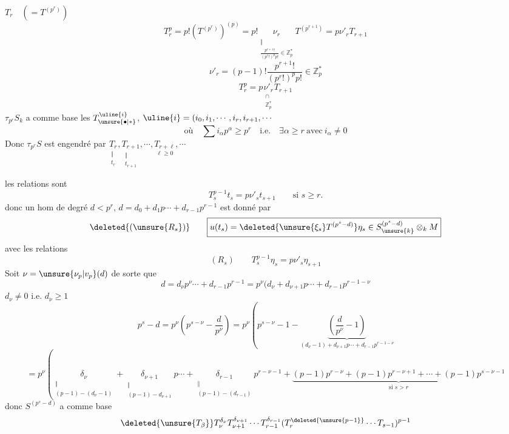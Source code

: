 $T_r\quad(=T^{(p^r)})$
\[
T_r^p=p!(T^{(p^r)})^{(p)}=p!\underset{\substack{\Vert\\\frac{p^{r+1}!}{(p^r!)^p p!}\in\mathbb Z_p^*}}{\nu_r}T^{(p^{r+1})}=p\nu'_rT_{r+1}
\]
\[
\nu'_r=(p-1)!\frac{p^{r+1}!}{(p^r!)^p p!}\in\mathbb Z_p^*
\]
\[
\boxed{T_r^p=p\underset{\substack{\cap\\\mathbb Z_p^*}}{\nu'_r}T_{r+1}}
\]
$\tau_{p^r}S_k$ a comme base les $T_{\unsure{\bullet|*}}^{\uline{i}}$, $\uline{i}=(i_0,i_1,\cdots,i_r,i_{r+1},\cdots$
\[
\text{où}\quad\sum i_\alpha p^\alpha\geq p^r\quad\text{i.e.}\quad\exists\alpha\geq r\ \text{avec}\ i_\alpha\ne0
\]
Donc $\tau_{p^r}S$ est engendré par $\underset{\substack{\Vert\\t_r}}{T_r},\underset{\substack{\Vert\\t_{r+1}}}{T_{r+1}},\cdots,\underset{\ell\geq0}{T_{r+\ell}},\cdots$

les relations sont
\[
\boxed{T_s^{p-1}t_s=p\nu'_s t_{s+1}\qquad\text{si }s\geq r}.
\]
donc un hom de degré $d<p^r$, $d=d_0+d_1p\cdots+d_{r-1}p^{r-1}$
est donné par 
\[
\deleted{(\unsure{R_s})}\qquad\boxed{u(t_s)=\deleted{\unsure{\xi_s}T^{(p^s-d)}}\eta_s\in S_{\unsure{k}}^{(p^s-d)}\otimes_k M}
\]
avec les relations
\[
(R_s)\qquad\boxed{T_s^{p-1}\eta_s=p\nu'_s\eta_{s+1}}
\]
Soit $\nu=\unsure{\nu_p|v_p}(d)$ de sorte que
\[
d=d_\nu p^\nu\cdots+d_{r-1}p^{r-1}=p^\nu(d_\nu+d_{\nu+1}p\cdots+d_{r-1}p^{r-1-\nu}
\]
$d_\nu\ne0$ i.e. $d_\nu\geq1$
\[
p^s-d=p^\nu\left(p^{s-\nu}-\frac d{p^\nu}\right)=p^\nu\left(p^{s-\nu}-1-\underbrace{\left(\frac d{p^\nu}-1\right)}_{(d_\nu-1)+d_{\nu+1}p\cdots+d_{r-1}p^{r-1-\nu}}\right.
\]
\[
=p^\nu\left(\underset{\substack{\Vert\\(p-1)-(d_\nu-1)}}{\delta_\nu}+\underset{\substack{\Vert\\(p-1)-d_{\nu+1}}}{\delta_{\nu+1}}p\cdots+\underset{\substack{\Vert\\(p-1)-(d_{r-1})}}{\delta_{r-1}}p^{r-\nu-1}+\underbrace{(p-1)p^{r-\nu}+(p-1)p^{r-\nu+1}+\cdots+(p-1)p^{s-\nu-1}}_{\text{si }s>r}\right.
\]
donc $S^{(p^s-d)}$ a comme base
\[
\deleted{\unsure{T_\beta}}T_\nu^{\delta_\nu}T_{\nu+1}^{\delta_{\nu+1}}\cdots T_{r-1}^{\delta_{r-1}}(T_r^{\deleted{\unsure{p-1}}}\cdots T_{s-1})^{p-1}
\]
